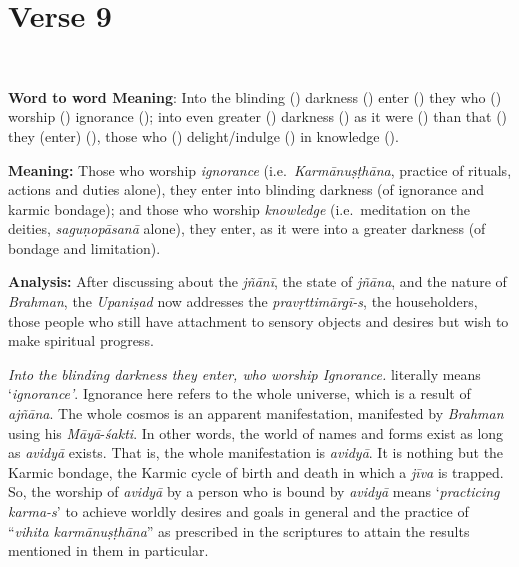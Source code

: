 \chapter{Verse 9}

\begin{moolashloka}
\\
\end{moolashloka}


\textbf{Word to word Meaning}: Into the blinding () darkness () enter () they who () worship () ignorance (); into even greater () darkness () as it were () than that () they (enter) (), those who () delight/indulge () in knowledge ().

\textbf{Meaning:} Those who worship \emph{ignorance} (i.e.\ \emph{Karmānuṣṭhāna}, practice of rituals, actions and duties alone), they enter into blinding darkness (of ignorance and karmic bondage); and those who worship \emph{knowledge} (i.e.\ meditation on the deities, \emph{saguṇopāsanā} alone), they enter, as it were into a greater darkness (of bondage and limitation).

\textbf{Analysis:} After discussing about the \emph{jñānī}, the state of \emph{jñāna}, and the nature of \emph{Brahman}, the \emph{Upaniṣad} now addresses the \emph{pravṛttimārgī-s}, the householders, those people who still have attachment to sensory objects and desires but wish to make spiritual progress.

 \emph{Into the blinding darkness they enter, who worship Ignorance.}  literally means `\emph{ignorance'}. Ignorance here refers to the whole universe, which is a result of \emph{ajñāna}. The whole cosmos is an apparent manifestation, manifested by \emph{Brahman} using his \emph{Māyā}-\emph{śakti}. In other words, the world of names and forms exist as long as \emph{avidyā} exists. That is, the whole manifestation is \emph{avidyā}. It is nothing but the Karmic bondage, the Karmic cycle of birth and death in which a \emph{jīva} is trapped. So, the worship of \emph{avidyā} by a person who is bound by \emph{avidyā} means `\emph{practicing karma-s}' to achieve worldly desires and goals in general and the practice of ``\emph{vihita karmānuṣṭhāna}'' as prescribed in the scriptures to attain the results mentioned in them in particular.

